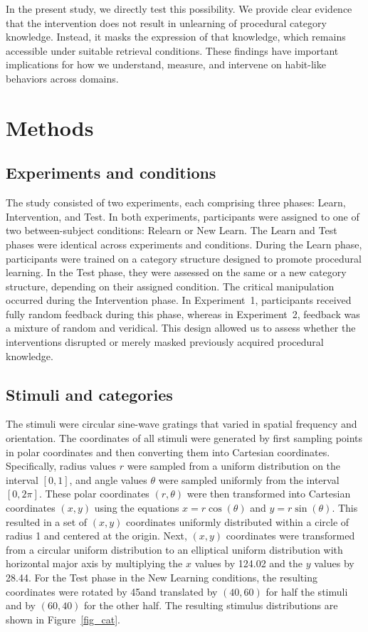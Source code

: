 \documentclass{article}
\begin{document}
In the present study, we directly test this possibility. We
provide clear evidence that the intervention does not result
in unlearning of procedural category knowledge. Instead, it
masks the expression of that knowledge, which remains
accessible under suitable retrieval conditions. These
findings have important implications for how we understand,
measure, and intervene on habit-like behaviors across
domains.

\section{Methods}

\subsection{Experiments and conditions}
The study consisted of two experiments, each comprising
three phases: Learn, Intervention, and Test. In both
experiments, participants were assigned to one of two
between-subject conditions: Relearn or New Learn. The Learn
and Test phases were identical across experiments and
conditions. During the Learn phase, participants were
trained on a category structure designed to promote
procedural learning. In the Test phase, they were assessed
on the same or a new category structure, depending on their
assigned condition. The critical manipulation occurred
during the Intervention phase. In Experiment~1, participants
received fully random feedback during this phase, whereas in
Experiment~2, feedback was a mixture of random and
veridical. This design allowed us to assess whether the
interventions disrupted or merely masked previously acquired
procedural knowledge.

\subsection{Stimuli and categories}
The stimuli were circular sine-wave gratings that varied in
spatial frequency and orientation.  The coordinates of all
stimuli were generated by first sampling points in polar
coordinates and then converting them into Cartesian
coordinates.  Specifically, radius values $r$ were sampled
from a uniform distribution on the interval $[0, 1]$, and
angle values $\theta$ were sampled uniformly from the
interval $[0, 2\pi]$.  These polar coordinates $(r, \theta)$
were then transformed into Cartesian coordinates $(x, y)$
using the equations $x = r \cos(\theta)$ and $y =
r\sin(\theta)$. This resulted in a set of $(x, y)$
coordinates uniformly distributed within a circle of radius
1 and centered at the origin. Next, $(x,y)$ coordinates were
transformed from a circular uniform distribution to an
elliptical uniform distribution with horizontal major axis
by multiplying the $x$ values by 124.02 and the $y$ values
by 28.44. For the Test phase in the New Learning conditions,
the resulting coordinates were rotated by 45\degree and
translated by $(40, 60)$ for half the stimuli and by $(60,
40)$ for the other half. The resulting stimulus
distributions are shown in Figure~\ref{fig_cat}.
\end{document}
